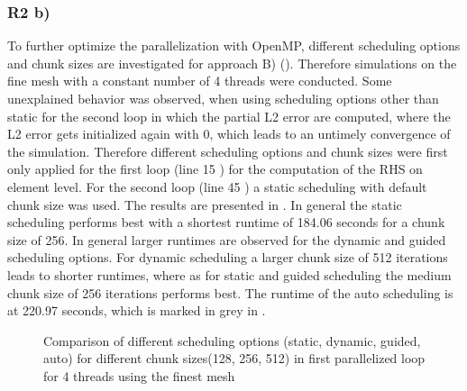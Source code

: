 \subsubsection{R2 b) \label{sec:Scheduling}}

To further optimize the parallelization with OpenMP, different scheduling options and chunk sizes are investigated for approach B) (). Therefore simulations on the fine mesh with a constant number of 4 threads were conducted. Some unexplained behavior was observed, when using scheduling options other than static for the second loop in which the partial L2 error are computed, where the L2 error gets initialized again with 0, which leads to an untimely convergence of the simulation. Therefore different scheduling options and chunk sizes were first only applied for the first loop (line 15 ) for the computation of the RHS on element level. For the second loop (line 45 ) a static scheduling with default chunk size was used. The results are presented in . 
In general the static scheduling performs best with a shortest runtime of 184.06 seconds for a chunk size of 256. In general larger runtimes are observed for the dynamic and guided scheduling options. For dynamic scheduling a larger chunk size of 512 iterations leads to shorter runtimes, where as for static and guided scheduling the medium chunk size of 256 iterations performs best. The runtime of the auto scheduling is at 220.97 seconds, which is marked in grey in .

\begin{figure}[h!]
	\centering
	\caption{\label{fig::Scheduling} Comparison of different scheduling options (static, dynamic, guided, auto) for different chunk sizes(128, 256, 512) in first parallelized loop for 4 threads using the finest mesh}
\end{figure}


